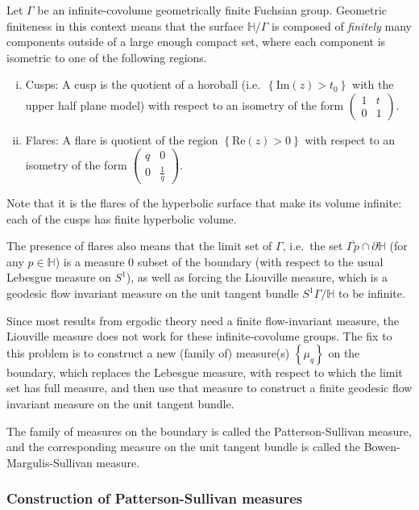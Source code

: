 Let $\Gamma$ be an infinite-covolume geometrically finite Fuchsian group.
Geometric finiteness in this context means that the surface $\mathbb{H}/\Gamma$ is composed of \emph{finitely} many components outside of a large enough compact set, where each component is isometric to one of the following regions.
\begin{enumerate}[(i)]
\item Cusps: A cusp is the quotient of a horoball (i.e.\ $\left\{ \mathrm{Im}(z) > t_0 \right\}$ with the upper half plane model) with respect to an isometry of the form $
  \begin{pmatrix}
    1 & t \\
    0 & 1
  \end{pmatrix}
  $.
\item Flares: A flare is quotient of the region $\left\{ \mathrm{Re}(z) > 0 \right\}$ with respect to an isometry of the form $
  \begin{pmatrix}
    q & 0 \\
    0 & \frac{1}{q}
  \end{pmatrix}
  $.
\end{enumerate}
Note that it is the flares of the hyperbolic surface that make its volume infinite: each of the cusps has finite hyperbolic volume.

The presence of flares also means that the limit set of $\Gamma$, i.e.\ the set $\overline{\Gamma p} \cap \partial \mathbb{H}$ (for any $p \in \mathbb{H}$) is a measure $0$ subset of the boundary (with respect to the usual Lebesgue measure on $S^1$), as well as forcing the Liouville measure, which is a geodesic flow invariant measure on the unit tangent bundle $S^1 \Gamma / \mathbb{H}$ to be infinite.

Since most results from ergodic theory need a finite flow-invariant measure, the Liouville measure does not work for these infinite-covolume groups.
The fix to this problem is to construct a new (family of) measure(s) $\left\{ \mu_q \right\}$ on the boundary, which replaces the Lebesgue measure, with respect to which the limit set has full measure, and then use that measure to construct a finite geodesic flow invariant measure on the unit tangent bundle.

The family of measures on the boundary is called the Patterson-Sullivan measure, and the corresponding measure on the unit tangent bundle is called the Bowen-Margulis-Sullivan measure.

\subsubsection{Construction of Patterson-Sullivan measures}
\label{sec:constr-patt-sull}

